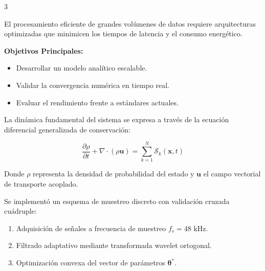 \documentclass[final]{article}
\begin{document}
\setlength{\columnsep}{2.5cm}
\begin{multicols}{3}

  \begin{tcolorbox}[title=1. Introducción y Motivación]
    {\LARGE
    El procesamiento eficiente de grandes volúmenes de datos requiere arquitecturas optimizadas que minimicen los tiempos de latencia y el consumo energético.
    
    \vspace{0.8cm}
    \textbf{Objetivos Principales:}
    \begin{itemize}
      \setlength{\itemsep}{0.6cm}
      \item Desarrollar un modelo analítico escalable.
      \item Validar la convergencia numérica en tiempo real.
      \item Evaluar el rendimiento frente a estándares actuales.
    \end{itemize}
    }
  \end{tcolorbox}

  \vspace{1.2cm}

  \begin{tcolorbox}[title=2. Marco Teórico y Formulación]
    {\LARGE
    La dinámica fundamental del sistema se expresa a través de la ecuación diferencial generalizada de conservación:
    
    \begin{equation*}
      \frac{\partial \rho}{\partial t} + \nabla \cdot (\rho \mathbf{u}) = \sum_{k=1}^{N} \mathcal{S}_k(\mathbf{x}, t)
    \end{equation*}

    Donde $\rho$ representa la densidad de probabilidad del estado y $\mathbf{u}$ el campo vectorial de transporte acoplado.
    }
  \end{tcolorbox}

  \begin{tcolorbox}[title=3. Metodología Experimental]
    {\LARGE
    Se implementó un esquema de muestreo discreto con validación cruzada cuádruple:
    
    \vspace{0.8cm}
    \begin{enumerate}
      \setlength{\itemsep}{0.6cm}
      \item Adquisición de señales a frecuencia de muestreo $f_s = 48\text{ kHz}$.
      \item Filtrado adaptativo mediante transformada wavelet ortogonal.
      \item Optimización convexa del vector de parámetros $\boldsymbol{\theta}^*$.
    \end{enumerate}
    }
  \end{tcolorbox}


\end{multicols}
\end{document}
